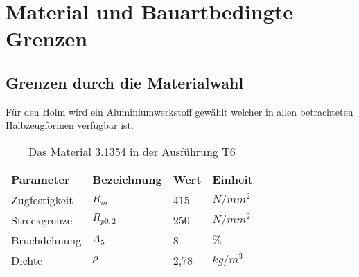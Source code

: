 \chapter{Material und Bauartbedingte Grenzen}\label{cha:Material- und Bauartbedingte Grenzen}

\section{Grenzen durch die Materialwahl}
\label{Materialwerte}

Für den Holm wird ein Aluminiumwerkstoff gewählt welcher in allen betrachteten Halbzeugformen verfügbar ist.

\begin{table}[h]
\centering
\begin{tabular}{|l|l|l|l|}
\hline
Parameter  & Bezeichnung &  Wert & Einheit \\ \hline
Zugfestigkeit  & $R_{m}$ & 415 & $N/mm^2$\\ \hline
Streckgrenze & $R_{p0,2}$  & 250 & $N/mm^2$\\ \hline
Bruchdehnung & $A_{5}$ & 8 & $\%$ \\ \hline
Dichte & $\rho$ & 2,78 & $kg/m^3$\\ \hline
\end{tabular}
\caption{Das Material 3.1354 in der Ausführung T6}
\label{tab:Das Material 3.1354 in der Ausführung T6}
\end{table}

